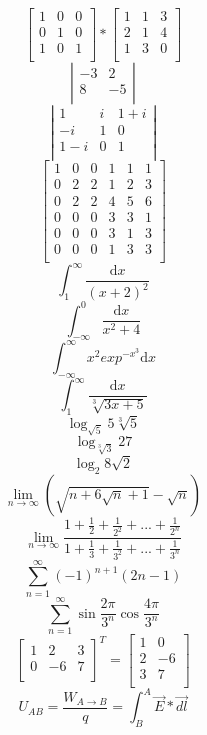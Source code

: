 \documentclass[12pt, letterpaper, titlepage]{article}
\begin{document}
$$\mathbf{}
\left[ \begin{array}{ccc}
1 & 0 & 0 \\
0 & 1 & 0 \\
1 & 0 & 1 \\
\end{array} \right]
*
\mathbf{}
\left[ \begin{array}{ccc}
1 & 1 & 3 \\
2 & 1 & 4 \\
1 & 3 & 0 \\
\end{array} \right]
$$
$$\mathbf{}
\left| \begin{array}{rr}
-3 & 2 \\
8 & -5 \\
\end{array} \right|$$
$$\mathbf{}
\left| \begin{array}{ccc}
1 & i & 1+i\\
-i & 1 & 0 \\
1-i & 0 & 1 \\
\end{array} \right|$$
$$\mathbf{}
\left[ \begin{array}{c|cc|ccc}
1 & 0 & 0 & 1 & 1 & 1\\
\hline
0 & 2 & 2 & 1 & 2 & 3\\
0 & 2 & 2 & 4 & 5 & 6\\
\hline
0 & 0 & 0 & 3 & 3 & 1\\
0 & 0 & 0 & 3 & 1 & 3\\
0 & 0 & 0 & 1 & 3 & 3\\
\end{array} \right]$$
$$ \int_{1}^{\infty} \frac{\mathrm{d} x}{(x+2)^2}$$
$$ \int_{-\infty}^{0} \frac{\mathrm{d} x}{x^2+4}$$
$$ \int_{-\infty}^{\infty} x^2 exp^{-x^3} \mathrm{d}x$$
$$ \int_{1}^{\infty} \frac{\mathrm{d} x}{\sqrt[3]{3x+5}}$$
$$\log_{\sqrt{5}} 5 \sqrt[3]{5}$$
$$\log_{\sqrt[3]{3}} 27$$
$$\log_{2} 8 \sqrt{2}$$
$$\lim_{n \rightarrow \infty}(\sqrt{n+6\sqrt{n}+1}-\sqrt{n}) $$
$$\lim_{n \rightarrow \infty}\frac{1+\frac{1}{2}+\frac{1}{2^2}+...+\frac{1}{2^n}}{1+\frac{1}{3}+\frac{1}{3^2}+...+\frac{1}{3^n}} $$
$$\sum_{n=1}^{\infty}(-1)^{n+1}(2n-1)$$
$$\sum_{n=1}^{\infty} \sin \frac{2 \pi}{3^n} \cos \frac{4 \pi}{3^n}$$
$$\mathbf{}
\left[ \begin{array}{lll}
1 & 2 & 3\\
0 & -6 & 7 \\
\end{array} \right]^T
=
\mathbf{}
\left[ \begin{array}{ll}
1 & 0 \\
2 & -6\\
3 & 7\\
\end{array} \right]
$$
$$U_{AB}=\frac{W_{A \rightarrow B}}{q}=\int_{B}^{A}\vec{E}*\vec{dl}   $$
\end{document}
